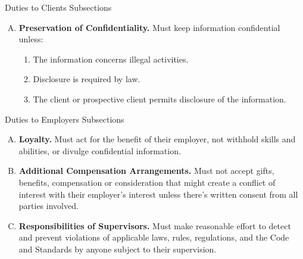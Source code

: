 \documentclass[../custom,grid]{flashcards}
\begin{document}
\begin{flashcard}{Duties to Clients Subsections}
\begin{enumerate}[A.]
        \item \textbf{Preservation of Confidentiality.} Must keep information confidential unless:
            \begin{enumerate}[1.]
                \item The information concerns illegal activities.
                \item Disclosure is required by law.
                \item The client or prospective client permits disclosure of the information.
            \end{enumerate}
    \end{enumerate}
\end{flashcard}

\begin{flashcard}{Duties to Employers Subsections}
    \begin{enumerate}[A.]
        \item \textbf{Loyalty.} Must act for the benefit of their employer, not withhold skills and abilities, or divulge confidential information.
        \item \textbf{Additional Compensation Arrangements.} Must not accept gifts, benefits, compensation or consideration that might create a conflict of interest with their employer's interest unless there's written consent from all parties involved.
        \item \textbf{Responsibilities of Supervisors.} Must make reasonable effort to detect and prevent violations of applicable laws, rules, regulations, and the Code and Standards by anyone subject to their supervision.
    \end{enumerate}
\end{flashcard}
\end{document}
